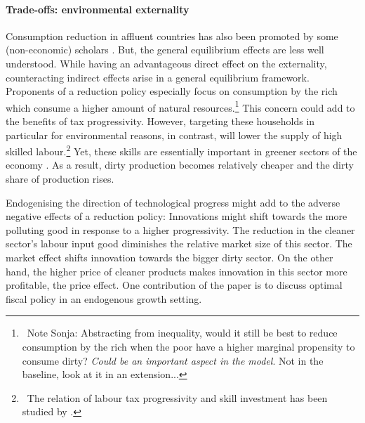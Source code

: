 
\paragraph{Trade-offs: environmental externality} Consumption reduction in affluent countries has also been promoted by some (non-economic) scholars \citep{Schor2005SustainableReduction, Pullinger2014WorkingDesign, Arrow2004AreMuch}. But, the general equilibrium effects are less well understood.
While having an advantageous direct effect on the externality, counteracting indirect effects arise in a general equilibrium framework. Proponents of a reduction policy especially focus on consumption by the rich which consume a higher amount of natural resources.\footnote{\ Note Sonja: Abstracting from inequality, would it still be best to reduce consumption by the rich when the poor have a higher marginal propensity to consume dirty? \textit{Could be an important aspect in the model}. Not in the baseline, look at it in an extension...}
This concern could add to the benefits of tax progressivity.
However, targeting these households in particular for environmental reasons, in contrast, will lower the supply of high skilled labour.\footnote{\ The relation of labour tax progressivity and skill investment has been studied by \cite{Heathcote2017OptimalFramework}.} Yet, these skills are essentially important in greener sectors of the economy \citep{Consoli2016DoCapital}. As a result, dirty production becomes relatively cheaper and the dirty share of production rises. 

Endogenising the direction of technological progress might add to the adverse negative effects of a reduction policy:
Innovations might shift towards the more polluting good in response to a higher progressivity. The reduction in the cleaner sector's labour input good diminishes the relative market size of this sector. The market effect shifts innovation towards the bigger dirty sector. On the other hand, the higher price of cleaner products makes innovation in this sector more profitable, the price effect. 
One contribution of the paper is to discuss optimal fiscal policy in an endogenous growth setting. 


